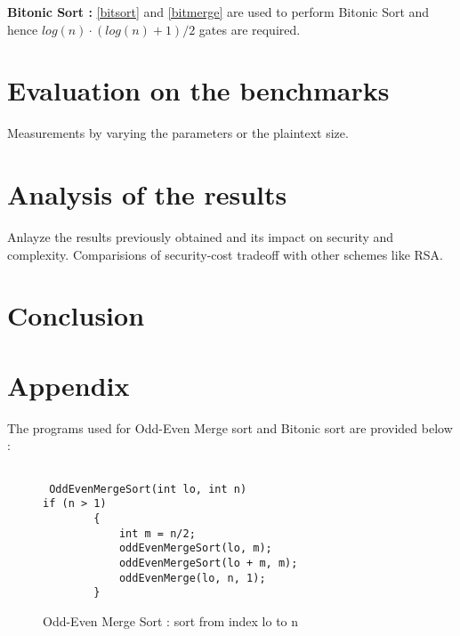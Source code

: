 \documentclass{acm_proc_article-sp}
\begin{document}
\textbf{Bitonic Sort :} \autoref{bitsort} and \autoref{bitmerge} are used to perform Bitonic Sort and hence $log(n) · (log(n)+1) / 2 $ gates are required.


\lstset{                                    %
  language=C,
  frame=lines,
  captionpos=b
 }


\renewcommand{\lstlistingname}{Code}

\section{Evaluation on the benchmarks}
Measurements by varying the parameters or the plaintext size.

\begin{figure*}


\end{figure*}


\section{Analysis of the results}

Anlayze the results previously obtained and its impact on security and complexity. Comparisions of security-cost tradeoff with other schemes like RSA.
\section{Conclusion}




  

\section{Appendix}

 The programs used for Odd-Even Merge sort and Bitonic sort are provided below : 


\begin{figure}[h]
\begin{lstlisting}[label = oesort ]

 OddEvenMergeSort(int lo, int n)
if (n > 1)
        {
            int m = n/2;
            oddEvenMergeSort(lo, m);
            oddEvenMergeSort(lo + m, m);
            oddEvenMerge(lo, n, 1);
        }

\end{lstlisting}
\caption{Odd-Even Merge Sort : sort from index lo to n }
\end{figure}
\end{document}
